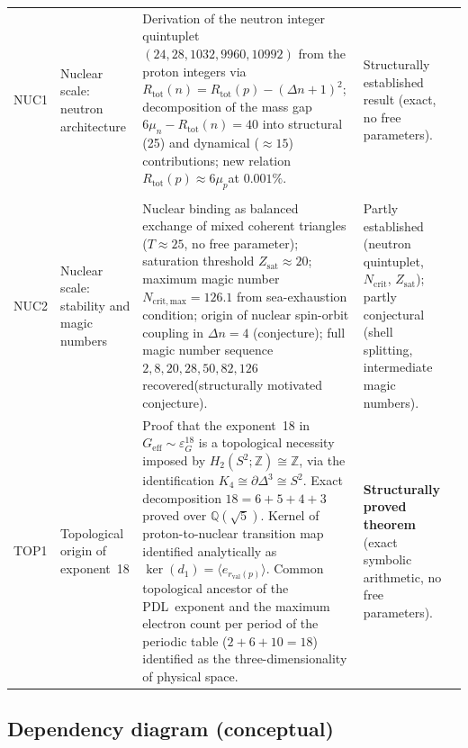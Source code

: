 \documentclass[11pt,a4paper]{article}
\newcommand{\PDL}{\textnormal{PDL}}
\begin{document}
\begin{longtable}{L{0.8cm}L{1.9cm}L{5.9cm}L{3cm}L{2.2cm}}
NUC1 &
Nuclear scale: neutron architecture &
Derivation of the neutron integer quintuplet $(24,28,1032,9960,10992)$ from the proton integers via $R_{\mathrm{tot}}(n) = R_{\mathrm{tot}}(p) - (\Delta n+1)^2$; decomposition of the mass gap $6\mu_n - R_{\mathrm{tot}}(n) = 40$ into structural (25) and dynamical ($\approx 15$) contributions; new relation $R_{\mathrm{tot}}(p) \approx 6\mu_p$at $0.001\%$. &
Structurally established result (exact, no free parameters). & \citep{Nuclear_Stability_PDL_2026} \\\\[0.4em]

NUC2 &
Nuclear scale: stability and magic numbers &
Nuclear binding as balanced exchange of mixed coherent triangles ($T \approx 25$, no free parameter); saturation threshold $Z_{\mathrm{sat}} \approx 20$; maximum magic number $N_{\mathrm{crit,max}} = 126.1$ from sea-exhaustion condition; origin of nuclear spin-orbit coupling in $\Delta n = 4$ (conjecture); full magic number sequence $2,8,20,28,50,82,126$ recovered(structurally motivated conjecture). & 
Partly established (neutron quintuplet, $N_{\mathrm{crit}}$, $Z_{\mathrm{sat}}$); partly conjectural (shell splitting, intermediate magic numbers). & \citep{Nuclear_Stability_PDL_2026} \\[0.4em]

TOP1 &
Topological origin of exponent~18 &
Proof that the exponent~18 in $G_{\mathrm{eff}} \sim \varepsilon_G^{18}$ is a topological necessity imposed by $H_2(S^2;\mathbb{Z}) \cong \mathbb{Z}$, via the identification $K_4 \cong \partial\Delta^3 \cong S^2$. Exact decomposition $18 = 6+5+4+3$ proved over $\mathbb{Q}(\sqrt{5})$. Kernel of proton-to-nuclear transition map identified analytically as $\ker(d_1) = \langle e_{r_{\mathrm{val}}(p)}\rangle$. Common topological ancestor of the \PDL\ exponent and the maximum electron count per period of the periodic table ($2+6+10=18$) identified as the three-dimensionality of physical space. &
\textbf{Structurally proved theorem} (exact symbolic arithmetic, no free parameters). &
\citep{Topology_18_PDL_2026} \\[0.4em]

\end{longtable}

\subsection{Dependency diagram (conceptual)}
\end{document}
